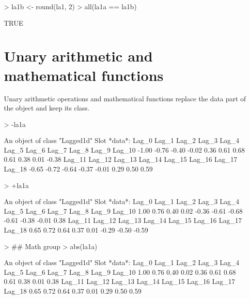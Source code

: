 \documentclass[a4paper,twoside,11pt,nojss,article]{jss}
\begin{document}
\begin{Schunk}
\begin{Sinput}
> la1b <- round(la1, 2)
> all(la1a == la1b)
\end{Sinput}
\begin{Soutput}
[1] TRUE
\end{Soutput}
\end{Schunk}




\section{Unary arithmetic and mathematical functions}
\label{sec:org9e5faa0}

Unary arithmetic operations and mathematical functions replace the data part of the object
and keep its class.
\begin{Schunk}
\begin{Sinput}
> -la1a
\end{Sinput}
\begin{Soutput}
An object of class "Lagged1d"
Slot *data*: 
 Lag_0  Lag_1  Lag_2  Lag_3  Lag_4  Lag_5  Lag_6  Lag_7  Lag_8  Lag_9 Lag_10 
 -1.00  -0.76  -0.40  -0.02   0.36   0.61   0.68   0.61   0.38   0.01  -0.38 
Lag_11 Lag_12 Lag_13 Lag_14 Lag_15 Lag_16 Lag_17 Lag_18 
 -0.65  -0.72  -0.64  -0.37  -0.01   0.29   0.50   0.59 
\end{Soutput}
\begin{Sinput}
> +la1a
\end{Sinput}
\begin{Soutput}
An object of class "Lagged1d"
Slot *data*: 
 Lag_0  Lag_1  Lag_2  Lag_3  Lag_4  Lag_5  Lag_6  Lag_7  Lag_8  Lag_9 Lag_10 
  1.00   0.76   0.40   0.02  -0.36  -0.61  -0.68  -0.61  -0.38  -0.01   0.38 
Lag_11 Lag_12 Lag_13 Lag_14 Lag_15 Lag_16 Lag_17 Lag_18 
  0.65   0.72   0.64   0.37   0.01  -0.29  -0.50  -0.59 
\end{Soutput}
\begin{Sinput}
> ## Math group
> abs(la1a)
\end{Sinput}
\begin{Soutput}
An object of class "Lagged1d"
Slot *data*: 
 Lag_0  Lag_1  Lag_2  Lag_3  Lag_4  Lag_5  Lag_6  Lag_7  Lag_8  Lag_9 Lag_10 
  1.00   0.76   0.40   0.02   0.36   0.61   0.68   0.61   0.38   0.01   0.38 
Lag_11 Lag_12 Lag_13 Lag_14 Lag_15 Lag_16 Lag_17 Lag_18 
  0.65   0.72   0.64   0.37   0.01   0.29   0.50   0.59 
\end{Soutput}
\begin{Sinput}

\end{Sinput}
\end{Schunk}
\end{document}
